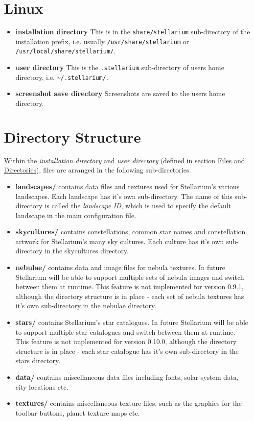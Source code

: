 \section{Linux}\label{linux}

\begin{itemize}
\item
  \textbf{installation directory} This is in the
  \texttt{share/stellarium} sub-directory of the installation prefix,
  i.e. usually \texttt{/usr/share/stellarium} or
  \texttt{/usr/local/share/stellarium/}.
\item
  \textbf{user directory} This is the \texttt{.stellarium} sub-directory
  of users home directory, i.e. \texttt{\textasciitilde{}/.stellarium/}.
\item
  \textbf{screenshot save directory} Screenshots are saved to the users
  home directory.
\end{itemize}

\section{Directory Structure}\label{directory-structure}

Within the \emph{installation directory} and \emph{user directory}
(defined in section \href{Advanced_Use\#Files_and_Directories}{Files and
Directories}), files are arranged in the following sub-directories.

\begin{itemize}
\item
  \textbf{landscapes/} contains data files and textures used for
  Stellarium's various landscapes. Each landscape has it's own
  sub-directory. The name of this sub-directory is called the
  \emph{landscape ID}, which is used to specify the default landscape in
  the main configuration file.
\item
  \textbf{skycultures/} contains constellations, common star names and
  constellation artwork for Stellarium's many sky cultures. Each culture
  has it's own sub-directory in the skycultures directory.
\item
  \textbf{nebulae/} contains data and image files for nebula textures.
  In future Stellarium will be able to support multiple sets of nebula
  images and switch between them at runtime. This feature is not
  implemented for version 0.9.1, although the directory structure is in
  place - each set of nebula textures has it's own sub-directory in the
  nebulae directory.
\item
  \textbf{stars/} contains Stellarium's star catalogues. In future
  Stellarium will be able to support multiple star catalogues and switch
  between them at runtime. This feature is not implemented for version
  0.10.0, although the directory structure is in place - each star
  catalogue has it's own sub-directory in the stars directory.
\item
  \textbf{data/} contains miscellaneous data files including fonts,
  solar system data, city locations etc.
\item
  \textbf{textures/} contains miscellaneous texture files, such as the
  graphics for the toolbar buttons, planet texture maps etc.
\end{itemize}

